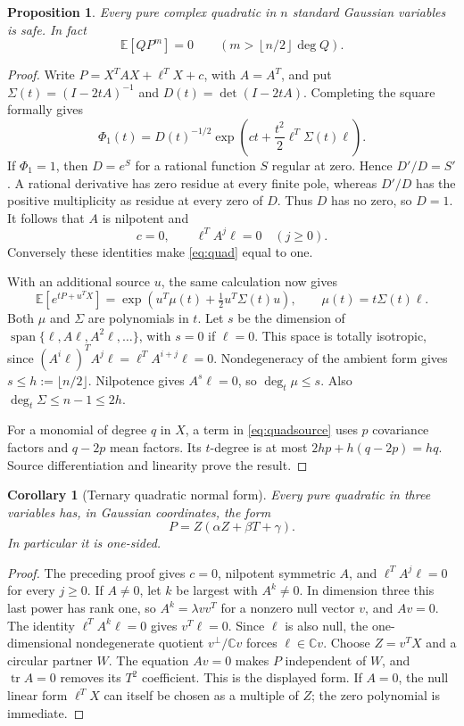 \documentclass[11pt]{article}
\newtheorem{proposition}[theorem]{Proposition}
\newtheorem{corollary}[theorem]{Corollary}
\theoremstyle{definition}\newtheorem{definition}[theorem]{Definition}
\theoremstyle{remark}\newtheorem{remark}[theorem]{Remark}
\newcommand{\E}{\mathbb E}
\newcommand{\C}{\mathbb C}
\newcommand{\tr}{\operatorname{tr}}
\DeclareMathOperator{\Span}{span}
\begin{document}
\begin{proposition}\label{prop:quadratic}
Every pure complex quadratic in $n$ standard Gaussian variables is safe.
In fact
\[
 \E[QP^m]=0\qquad\left(m>\left\lfloor n/2\right\rfloor\deg Q\right).
\]
\end{proposition}
\begin{proof}
Write $P=X^TAX+\ell^TX+c$, with $A=A^T$, and put
$\Sigma(t)=(I-2tA)^{-1}$ and $D(t)=\det(I-2tA)$. Completing the
square formally gives
\begin{equation}\label{eq:quad}
 \Phi_1(t)=D(t)^{-1/2}
   \exp\!\left(ct+\frac{t^2}{2}\ell^T\Sigma(t)\ell\right).
\end{equation}
If $\Phi_1=1$, then $D=e^S$ for a rational function $S$ regular at
zero. Hence $D'/D=S'$. A rational derivative has zero residue at every
finite pole, whereas $D'/D$ has the positive multiplicity as residue at
every zero of $D$. Thus $D$ has no zero, so $D=1$. It follows that
$A$ is nilpotent and
\[
 c=0,\qquad \ell^TA^j\ell=0\quad(j\geq0).
\]
Conversely these identities make \eqref{eq:quad} equal to one.

With an additional source $u$, the same calculation now gives
\begin{equation}\label{eq:quadsource}
 \E[e^{tP+u^TX}]
   =\exp\!\left(u^T\mu(t)+\tfrac12u^T\Sigma(t)u\right),
 \qquad \mu(t)=t\Sigma(t)\ell.
\end{equation}
Both $\mu$ and $\Sigma$ are polynomials in $t$. Let $s$ be the dimension
of $\Span\{\ell,A\ell,A^2\ell,\ldots\}$, with $s=0$ if $\ell=0$.
This space is totally isotropic, since
$(A^i\ell)^TA^j\ell=\ell^TA^{i+j}\ell=0$. Nondegeneracy of the
ambient form gives $s\leq h:=\lfloor n/2\rfloor$. Nilpotence gives
$A^s\ell=0$, so $\deg_t\mu\leq s$. Also
$\deg_t\Sigma\leq n-1\leq2h$.

For a monomial of degree $q$ in $X$, a term in
\eqref{eq:quadsource} uses $p$ covariance factors and $q-2p$ mean
factors. Its $t$-degree is at most
$2hp+h(q-2p)=hq$. Source differentiation and linearity prove the result.
\end{proof}

\begin{corollary}[Ternary quadratic normal form]
\label{cor:quadraticnormal}
Every pure quadratic in three variables has, in Gaussian coordinates,
the form
\[
 P=Z(\alpha Z+\beta T+\gamma).
\]
In particular it is one-sided.
\end{corollary}
\begin{proof}
The preceding proof gives $c=0$, nilpotent symmetric $A$, and
$\ell^TA^j\ell=0$ for every $j\ge0$. If $A\ne0$, let $k$ be largest
with $A^k\ne0$. In dimension three this last power has rank one,
so $A^k=\lambda vv^T$ for a nonzero null vector $v$, and $Av=0$.
The identity $\ell^TA^k\ell=0$ gives $v^T\ell=0$. Since $\ell$ is
also null, the one-dimensional nondegenerate quotient
$v^\perp/\C v$ forces $\ell\in\C v$.
Choose $Z=v^TX$ and a circular partner $W$. The equation $Av=0$
makes $P$ independent of $W$, and $\tr A=0$ removes its $T^2$
coefficient. This is the displayed form. If $A=0$, the null linear
form $\ell^TX$ can itself be chosen as a multiple of $Z$; the zero
polynomial is immediate.
\end{proof}
\end{document}
